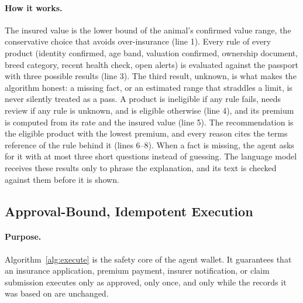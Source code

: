 \documentclass[11pt,letterpaper]{article}
\begin{document}
\paragraph{How it works.} The insured value is the lower bound of the animal's confirmed value range, the conservative choice that avoids over-insurance (line 1). Every rule of every product (identity confirmed, age band, valuation confirmed, ownership document, breed category, recent health check, open alerts) is evaluated against the passport with three possible results (line 3). The third result, unknown, is what makes the algorithm honest: a missing fact, or an estimated range that straddles a limit, is never silently treated as a pass. A product is ineligible if any rule fails, needs review if any rule is unknown, and is eligible otherwise (line 4), and its premium is computed from its rate and the insured value (line 5). The recommendation is the eligible product with the lowest premium, and every reason cites the terms reference of the rule behind it (lines 6--8). When a fact is missing, the agent asks for it with at most three short questions instead of guessing. The language model receives these results only to phrase the explanation, and its text is checked against them before it is shown.

\subsection{Approval-Bound, Idempotent Execution}

\paragraph{Purpose.} Algorithm~\ref{alg:execute} is the safety core of the agent wallet. It guarantees that an insurance application, premium payment, insurer notification, or claim submission executes only as approved, only once, and only while the records it was based on are unchanged.
\end{document}
